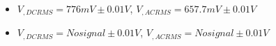 \begin{itemize}
     \item $V_{, DCRMS}=776mV\pm 0.01\unit{V}$, $V_{, ACRMS}=657.7mV\pm 0.01\unit{V}$ 
     \item $V_{, DCRMS}=No signal\pm 0.01\unit{V}$, $V_{, ACRMS}=No signal\pm 0.01\unit{V}$\\
\end{itemize}